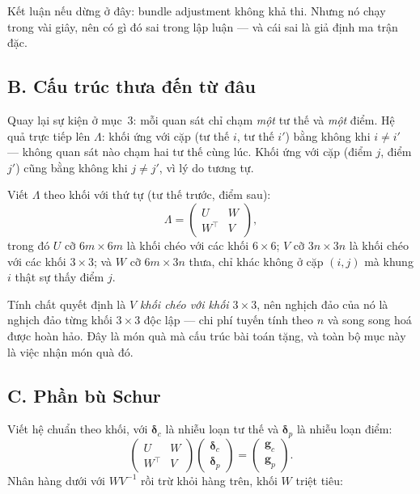 \documentclass[../../vslam.tex]{subfiles}
\begin{document}
Kết luận nếu dừng ở đây: bundle adjustment không khả thi. Nhưng nó chạy trong vài giây, nên có gì đó sai trong lập luận --- và cái sai là giả định ma trận đặc.

\subsection{B. Cấu trúc thưa đến từ đâu}

Quay lại sự kiện ở mục~3: mỗi quan sát chỉ chạm \emph{một} tư thế và \emph{một} điểm. Hệ quả trực tiếp lên \(\Lambda\): khối ứng với cặp (tư thế \(i\), tư thế \(i'\)) bằng không khi \(i \neq i'\) --- không quan sát nào chạm hai tư thế cùng lúc. Khối ứng với cặp (điểm \(j\), điểm \(j'\)) cũng bằng không khi \(j\neq j'\), vì lý do tương tự.

Viết \(\Lambda\) theo khối với thứ tự (tư thế trước, điểm sau):
\[
\Lambda = \begin{pmatrix} U & W \\ W^{\top} & V \end{pmatrix},
\]
trong đó \(U\) cỡ \(6m\times 6m\) là khối chéo với các khối \(6\times 6\); \(V\) cỡ \(3n\times 3n\) là khối chéo với các khối \(3\times 3\); và \(W\) cỡ \(6m\times 3n\) thưa, chỉ khác không ở cặp \((i,j)\) mà khung \(i\) thật sự thấy điểm \(j\).

Tính chất quyết định là \emph{\(V\) khối chéo với khối \(3\times 3\)}, nên nghịch đảo của nó là nghịch đảo từng khối \(3\times3\) độc lập --- chi phí tuyến tính theo \(n\) và song song hoá được hoàn hảo. Đây là món quà mà cấu trúc bài toán tặng, và toàn bộ mục này là việc nhận món quà đó.

\subsection{C. Phần bù Schur}

Viết hệ chuẩn theo khối, với \(\boldsymbol{\delta}_c\) là nhiễu loạn tư thế và \(\boldsymbol{\delta}_p\) là nhiễu loạn điểm:
\[
\begin{pmatrix} U & W \\ W^{\top} & V\end{pmatrix}
\begin{pmatrix}\boldsymbol{\delta}_c \\ \boldsymbol{\delta}_p\end{pmatrix}
=
\begin{pmatrix}\mathbf{g}_c \\ \mathbf{g}_p\end{pmatrix}.
\]
Nhân hàng dưới với \(WV^{-1}\) rồi trừ khỏi hàng trên, khối \(W\) triệt tiêu:
\end{document}
